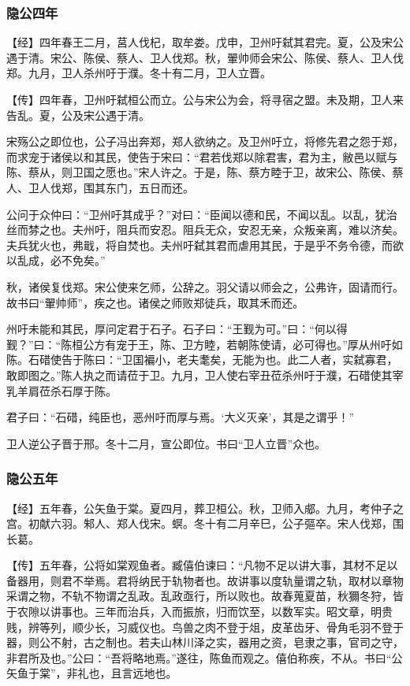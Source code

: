 \documentclass[]{article}
\begin{document}
\hypertarget{header-n53}{%
\subsubsection{隐公四年}\label{header-n53}}

【经】四年春王二月，莒人伐杞，取牟娄。戊申，卫州吁弑其君完。夏，公及宋公遇于清。宋公、陈侯、蔡人、卫人伐郑。秋，翬帅师会宋公、陈侯、蔡人、卫人伐郑。九月，卫人杀州吁于濮。冬十有二月，卫人立晋。

【传】四年春，卫州吁弑桓公而立。公与宋公为会，将寻宿之盟。未及期，卫人来告乱。夏，公及宋公遇于清。

宋殇公之即位也，公子冯出奔郑，郑人欲纳之。及卫州吁立，将修先君之怨于郑，而求宠于诸侯以和其民，使告于宋曰：``君若伐郑以除君害，君为主，敝邑以赋与陈、蔡从，则卫国之愿也。''宋人许之。于是，陈、蔡方睦于卫，故宋公、陈侯、蔡人、卫人伐郑，围其东门，五日而还。

公问于众仲曰：``卫州吁其成乎？''对曰：``臣闻以德和民，不闻以乱。以乱，犹治丝而棼之也。夫州吁，阻兵而安忍。阻兵无众，安忍无亲，众叛亲离，难以济矣。夫兵犹火也，弗戢，将自焚也。夫州吁弑其君而虐用其民，于是乎不务令德，而欲以乱成，必不免矣。''

秋，诸侯复伐郑。宋公使来乞师，公辞之。羽父请以师会之，公弗许，固请而行。故书曰``翬帅师''，疾之也。诸侯之师败郑徒兵，取其禾而还。

州吁未能和其民，厚问定君于石子。石子曰：``王觐为可。''曰：``何以得觐？''曰：``陈桓公方有宠于王，陈、卫方睦，若朝陈使请，必可得也。''厚从州吁如陈。石碏使告于陈曰：``卫国褊小，老夫耄矣，无能为也。此二人者，实弑寡君，敢即图之。''陈人执之而请莅于卫。九月，卫人使右宰丑莅杀州吁于濮，石碏使其宰乳羊肩莅杀石厚于陈。

君子曰：``石碏，纯臣也，恶州吁而厚与焉。`大义灭亲'，其是之谓乎！''

卫人逆公子晋于邢。冬十二月，宣公即位。书曰``卫人立晋''众也。

\hypertarget{header-n64}{%
\subsubsection{隐公五年}\label{header-n64}}

【经】五年春，公矢鱼于棠。夏四月，葬卫桓公。秋，卫师入郕。九月，考仲子之宫。初献六羽。邾人、郑人伐宋。螟。冬十有二月辛巳，公子彄卒。宋人伐郑，围长葛。

【传】五年春，公将如棠观鱼者。臧僖伯谏曰：``凡物不足以讲大事，其材不足以备器用，则君不举焉。君将纳民于轨物者也。故讲事以度轨量谓之轨，取材以章物采谓之物，不轨不物谓之乱政。乱政亟行，所以败也。故春蒐夏苗，秋獮冬狩，皆于农隙以讲事也。三年而治兵，入而振旅，归而饮至，以数军实。昭文章，明贵贱，辨等列，顺少长，习威仪也。鸟兽之肉不登于俎，皮革齿牙、骨角毛羽不登于器，则公不射，古之制也。若夫山林川泽之实，器用之资，皂隶之事，官司之守，非君所及也。''公曰：``吾将略地焉。''遂往，陈鱼而观之。僖伯称疾，不从。书曰``公矢鱼于棠''，非礼也，且言远地也。
\end{document}
